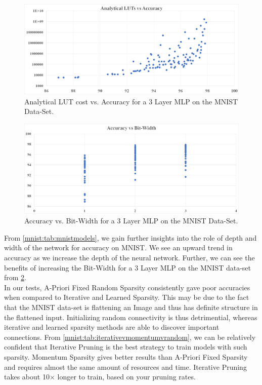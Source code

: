 \begin{figure}[h]
    \centering
    \includegraphics[width=330pt]{figures/bison/3lmlplutacc.png}
    \caption{Analytical LUT cost vs. Accuracy for a 3 Layer MLP on the MNIST Data-Set.}
    \label{fig:3lmlplutacc}
\end{figure}

\begin{figure}[h]
    \centering
    \includegraphics[width=330pt]{figures/bison/3lmnistaccbw.png}
    \caption{Accuracy vs. Bit-Width for a 3 Layer MLP on the MNIST Data-Set.}
    \label{fig:3lmnistaccbw}
\end{figure}


From \cref{mnist:tab:mnistmodels}, we gain further insights into the role of depth and width of the network for accuracy on MNIST. We see an upward trend in accuracy as we increase the depth of the neural network. Further, we can see the benefits of increasing the Bit-Width for a 3 Layer MLP on the  MNIST data-set from \cref{fig:3lmnistaccbw}. \\


In our tests, A-Priori Fixed Random Sparsity consistently gave poor accuracies when compared to Iterative and Learned Sparsity. This may be due to the fact that the MNIST data-set is flattening an Image and thus has definite structure in the flattened input. Initializing random connectivity is thus detrimential, whereas iterative and learned sparsity methods are able to discover important connections. From \cref{mnist:tab:iterativevmomentumvrandom}, we can be relatively confident that Iterative Pruning is the best strategy to train models with such sparsity. Momentum Sparsity gives better results than A-Priori Fixed Sparsity and requires almost the same amount of resources and time. Iterative Pruning takes about 10$\times$ longer to train, based on your pruning rates.

